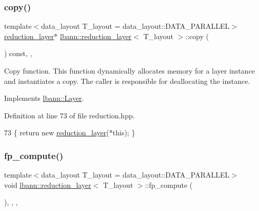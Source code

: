 \subsubsection{\texorpdfstring{copy()}{copy()}}
{\footnotesize\ttfamily template$<$data\+\_\+layout T\+\_\+layout = data\+\_\+layout\+::\+D\+A\+T\+A\+\_\+\+P\+A\+R\+A\+L\+L\+EL$>$ \\
\hyperlink{classlbann_1_1reduction__layer}{reduction\+\_\+layer}$\ast$ \hyperlink{classlbann_1_1reduction__layer}{lbann\+::reduction\+\_\+layer}$<$ T\+\_\+layout $>$\+::copy (\begin{DoxyParamCaption}{ }\end{DoxyParamCaption}) const\hspace{0.3cm}{\ttfamily [inline]}, {\ttfamily [override]}, {\ttfamily [virtual]}}

Copy function. This function dynamically allocates memory for a layer instance and instantiates a copy. The caller is responsible for deallocating the instance. 

Implements \hyperlink{classlbann_1_1Layer_af420f22bbac801c85483ade84588a23f}{lbann\+::\+Layer}.



Definition at line 73 of file reduction.\+hpp.


\begin{DoxyCode}
73 \{ \textcolor{keywordflow}{return} \textcolor{keyword}{new} \hyperlink{classlbann_1_1reduction__layer_ac6e8498f03708ce51e389116107bf135}{reduction\_layer}(*\textcolor{keyword}{this}); \}
\end{DoxyCode}
\mbox{\label{classlbann_1_1reduction__layer_a7e78d0d69106611bfb5ff3fe5bb01016}} 
\subsubsection{\texorpdfstring{fp\+\_\+compute()}{fp\_compute()}}
{\footnotesize\ttfamily template$<$data\+\_\+layout T\+\_\+layout = data\+\_\+layout\+::\+D\+A\+T\+A\+\_\+\+P\+A\+R\+A\+L\+L\+EL$>$ \\
void \hyperlink{classlbann_1_1reduction__layer}{lbann\+::reduction\+\_\+layer}$<$ T\+\_\+layout $>$\+::fp\+\_\+compute (\begin{DoxyParamCaption}{ }\end{DoxyParamCaption})\hspace{0.3cm}{\ttfamily [inline]}, {\ttfamily [override]}, {\ttfamily [protected]}, {\ttfamily [virtual]}}

